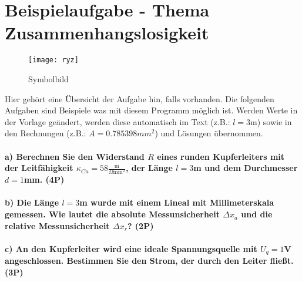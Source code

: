 \documentclass{article}
\begin{document}
\part*{Beispielaufgabe - Thema Zusammenhangslosigkeit}

\begin{wrapfigure}{r}{0.3\textwidth}
\centering
\texttt{[image: ryz]}
\caption*{Symbolbild}
\end{wrapfigure}
Hier gehört eine Übersicht der Aufgabe hin, falls vorhanden. Die folgenden Aufgaben sind Beispiele was mit diesem Programm möglich ist. Werden Werte in der Vorlage geändert, werden diese automatisch im Text (z.B.: $l= 3$m) sowie in den Rechnungen (z.B.: $A= 0.785398mm^2$) und Lösungen übernommen.\\
\subsection*{a) Berechnen Sie den Widerstand $R$ eines runden Kupferleiters mit der Leitfähigkeit $\kappa_{Cu}= 58\frac{\text{m}}{\Omega\text{mm}^2}$, der Länge $l = 3$m und dem Durchmesser $d = 1$mm. (4P)}

\vspace{15mm}\vspace{15mm}
\subsection*{b) Die Länge $l= 3$m wurde mit einem Lineal mit Millimeterskala gemessen. Wie lautet die absolute Messunsicherheit $\Delta x_a$ und die relative Messunsicherheit $\Delta x_r$? (2P)}

\vspace{15mm}\vspace{15mm}\vspace{15mm}
\subsection*{c) An den Kupferleiter wird eine ideale Spannungsquelle mit $U_q= 1$V angeschlossen. Bestimmen Sie den Strom, der durch den Leiter fließt. (3P)}

\vspace{15mm}
\end{document}
